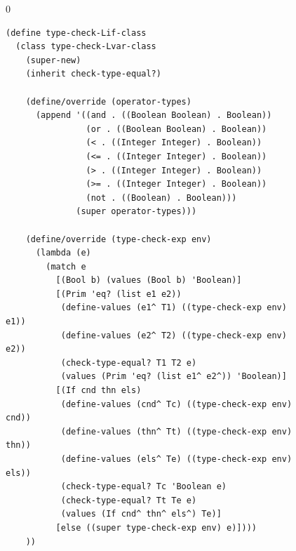 \documentclass[7x10]{TimesAPriori_MIT}%
\def\racketEd{0}
\def\edition{0}
\numberwithin{theorem}{chapter}
\numberwithin{definition}{chapter}
\numberwithin{equation}{chapter}
\begin{document}
\begin{figure}[tbp]
\begin{tcolorbox}[colback=white]  
{\if\edition\racketEd    
\begin{lstlisting}[basicstyle=\ttfamily\footnotesize]
(define type-check-Lif-class
  (class type-check-Lvar-class
    (super-new)
    (inherit check-type-equal?)
    
    (define/override (operator-types)
      (append '((and . ((Boolean Boolean) . Boolean))
                (or . ((Boolean Boolean) . Boolean))
                (< . ((Integer Integer) . Boolean))
                (<= . ((Integer Integer) . Boolean))
                (> . ((Integer Integer) . Boolean))
                (>= . ((Integer Integer) . Boolean))
                (not . ((Boolean) . Boolean)))
              (super operator-types)))

    (define/override (type-check-exp env)
      (lambda (e)
        (match e
          [(Bool b) (values (Bool b) 'Boolean)]
          [(Prim 'eq? (list e1 e2))
           (define-values (e1^ T1) ((type-check-exp env) e1))
           (define-values (e2^ T2) ((type-check-exp env) e2))
           (check-type-equal? T1 T2 e)
           (values (Prim 'eq? (list e1^ e2^)) 'Boolean)]
          [(If cnd thn els)
           (define-values (cnd^ Tc) ((type-check-exp env) cnd))
           (define-values (thn^ Tt) ((type-check-exp env) thn))
           (define-values (els^ Te) ((type-check-exp env) els))
           (check-type-equal? Tc 'Boolean e)
           (check-type-equal? Tt Te e)
           (values (If cnd^ thn^ els^) Te)]
          [else ((super type-check-exp env) e)])))
    ))


\end{lstlisting}}
\end{tcolorbox}
\end{figure}
\end{document}
